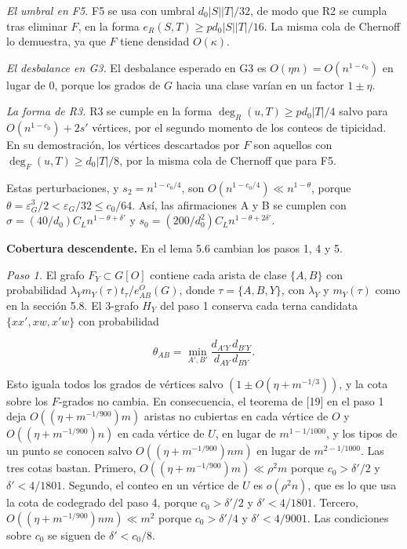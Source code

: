 \documentclass[spanish,11pt,a4paper]{article}
\begin{document}
\emph{El umbral en F5.} F5 se usa con umbral \(d_0|S||T|/32\), de modo que R2 se cumpla tras eliminar \(F\), en la forma \(e_R(S,T)\ge pd_0|S||T|/16\). La misma cola de Chernoff lo demuestra, ya que \(F\) tiene densidad \(O(\kappa)\).

\emph{El desbalance en G3.} El desbalance esperado en G3 es \(O(\eta n)=O(n^{1-c_0})\) en lugar de \(0\), porque los grados de \(G\) hacia una clase varían en un factor \(1\pm\eta\).

\emph{La forma de R3.} R3 se cumple en la forma \(\deg_R(u,T)\ge pd_0|T|/4\) salvo para \(O(n^{1-c_0})+2s'\) vértices, por el segundo momento de los conteos de tipicidad. En su demostración, los vértices descartados por \(F\) son aquellos con \(\deg_F(u,T)\ge d_0|T|/8\), por la misma cola de Chernoff que para F5.

Estas perturbaciones, y \(s_2=n^{1-c_0/4}\), son \(O(n^{1-c_0/4})\ll n^{1-\theta}\), porque \(\theta=\varepsilon_G^3/2<\varepsilon_G/32\le c_0/64\). Así, las afirmaciones A y B se cumplen con \(\sigma=(40/d_0)C_Ln^{1-\theta+\delta'}\) y \(s_0=(200/d_0^2)C_Ln^{1-\theta+2\delta'}\).

\textbf{Cobertura descendente.} En el lema 5.6 cambian los pasos 1, 4 y 5.

\emph{Paso 1.} El grafo \(F_Y\subset G[O]\) contiene cada arista de clase \(\{A,B\}\) con probabilidad \(\lambda_Y m_Y(\tau)t_\tau/e^O_{AB}(G)\), donde \(\tau=\{A,B,Y\}\), con \(\lambda_Y\) y \(m_Y(\tau)\) como en la sección 5.8. El 3-grafo \(H_Y\) del paso 1 conserva cada terna candidata \(\{xx',xw,x'w\}\) con probabilidad

\nopagebreak[4]
\[\theta_{AB}=\min_{A',B'}\frac{d_{A'Y}\,d_{B'Y}}{d_{AY}\,d_{BY}}.\]

Esto iguala todos los grados de vértices salvo \((1\pm O(\eta+m^{-1/3}))\), y la cota sobre los \(F\)-grados no cambia. En consecuencia, el teorema de {[}19{]} en el paso 1 deja \(O((\eta+m^{-1/900})m)\) aristas no cubiertas en cada vértice de \(O\) y \(O((\eta+m^{-1/900})n)\) en cada vértice de \(U\), en lugar de \(m^{1-1/1000}\), y los tipos de un punto se conocen salvo \(O((\eta+m^{-1/900})nm)\) en lugar de \(m^{2-1/1000}\). Las tres cotas bastan. Primero, \(O((\eta+m^{-1/900})m)\ll\rho^2m\) porque \(c_0>\delta'/2\) y \(\delta'<4/1801\). Segundo, el conteo en un vértice de \(U\) es \(o(\rho^2n)\), que es lo que usa la cota de codegrado del paso 4, porque \(c_0>\delta'/2\) y \(\delta'<4/1801\). Tercero, \(O((\eta+m^{-1/900})nm)\ll m^2\) porque \(c_0>\delta'/4\) y \(\delta'<4/9001\). Las condiciones sobre \(c_0\) se siguen de \(\delta'<c_0/8\).
\end{document}
